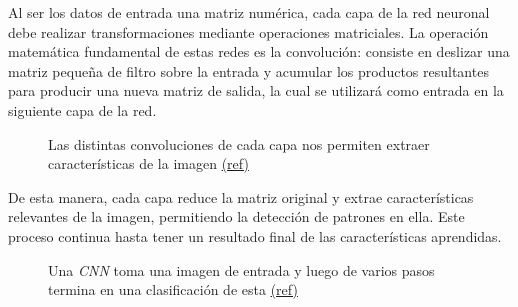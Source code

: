\documentclass[a4paper]{article}
\begin{document}
Al ser los datos de entrada una matriz numérica, cada capa de la red neuronal debe realizar transformaciones mediante operaciones matriciales. La operación matemática fundamental de estas redes es la convolución: consiste en deslizar una matriz pequeña de filtro sobre la entrada y acumular los productos resultantes para producir una nueva matriz de salida, la cual se utilizará como entrada en la siguiente capa de la red.

\begin{figure}[H]
\caption{Las distintas convoluciones de cada capa nos permiten extraer características de la imagen \scriptsize{\href{https://doi.org/10.1007/s00371-020-01878-6}{(ref)}}}
\end{figure}

De esta manera, cada capa reduce la matriz original y extrae características relevantes de la imagen, permitiendo la detección de patrones en ella. Este proceso continua hasta tener un resultado final de las características aprendidas.

\begin{figure}[H]
\caption{Una \textit{CNN} toma una imagen de entrada y luego de varios pasos termina en una clasificación de esta \scriptsize{\href{https://nafizshahriar.medium.com/what-is-convolutional-neural-network-cnn-deep-learning-b3921bdd82d5}{(ref)}}}
\end{figure}
\end{document}
